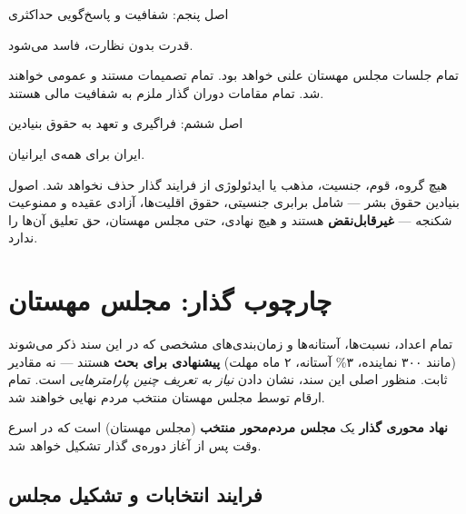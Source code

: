 \documentclass[12pt,a4paper,twoside,openany]{book}
\begin{document}
	\begin{principlebox}{اصل پنجم: شفافیت و پاسخ‌گویی حداکثری}
		\begin{quotebox}
			قدرت بدون نظارت، فاسد می‌شود.
		\end{quotebox}
		
		تمام جلسات مجلس مهستان علنی خواهد بود. تمام تصمیمات مستند و عمومی خواهند شد.
		تمام مقامات دوران گذار ملزم به شفافیت مالی هستند.
	\end{principlebox}
	
	\begin{principlebox}{اصل ششم: فراگیری و تعهد به حقوق بنیادین}
		\begin{quotebox}
			ایران برای همه‌ی ایرانیان.
		\end{quotebox}
		
		هیچ گروه، قوم، جنسیت، مذهب یا ایدئولوژی از فرایند گذار حذف نخواهد شد. اصول بنیادین
		حقوق بشر --- شامل برابری جنسیتی، حقوق اقلیت‌ها، آزادی عقیده و ممنوعیت شکنجه ---
		\textbf{غیرقابل‌نقض} هستند و هیچ نهادی، حتی مجلس مهستان، حق تعلیق آن‌ها را ندارد.
	\end{principlebox}
	
	\chapter{چارچوب گذار: مجلس مهستان}
	\label{ch:mahestan}
	
	\begin{notebox}[title={\rl{یادداشت مهم درباره‌ی اعداد و نسبت‌های این سند}}]
		تمام اعداد، نسبت‌ها، آستانه‌ها و زمان‌بندی‌های مشخصی که در این سند ذکر می‌شوند
		(مانند ۳۰۰ نماینده، ۳\% آستانه، ۲ ماه مهلت) \textbf{پیشنهادی برای بحث} هستند ---
		نه مقادیر ثابت. منظور اصلی این سند، نشان دادن \emph{نیاز به تعریف چنین پارامترهایی}
		است. تمام ارقام توسط مجلس مهستان منتخب مردم نهایی خواهند شد.
	\end{notebox}
	
	\textbf{نهاد محوری گذار} یک \textbf{مجلس مردم‌محور منتخب} (مجلس مهستان) است که
	در اسرع وقت پس از آغاز دوره‌ی گذار تشکیل خواهد شد.
	
	\section{فرایند انتخابات و تشکیل مجلس}
	
\end{document}

